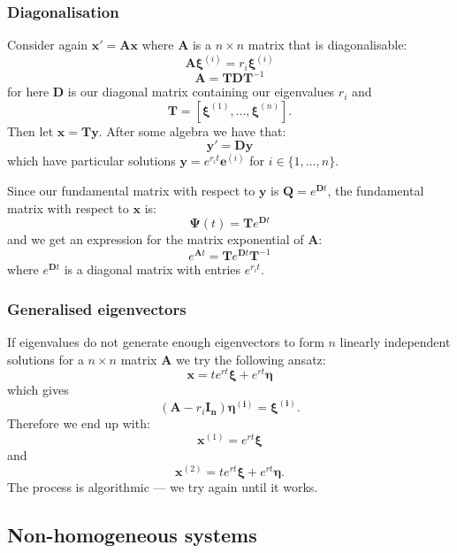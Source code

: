 \documentclass{article}
\newcommand{\matr}[1]{\mathbf{#1}}
\begin{document}
\newpage

\subsubsection{Diagonalisation}
Consider again $\boldsymbol{x}'
=\boldsymbol{A}\boldsymbol{x}$ where
$\boldsymbol{A}$ is a $n \times n$ matrix
that is diagonalisable:
$$\boldsymbol{A}\boldsymbol{\xi}^{(i)}
=r_i\boldsymbol{\xi}^{(i)}$$
$$\boldsymbol{A}=\boldsymbol{T}
\boldsymbol{D}\boldsymbol{T}^{-1}$$
for here $\boldsymbol{D}$ is our diagonal matrix
containing our eigenvalues $r_i$ and
$$\boldsymbol{T}
=[\boldsymbol{\xi}^{(1)},\dots
,\boldsymbol{\xi}^{(n)}].$$
Then let $\boldsymbol{x}=\boldsymbol{T}
\boldsymbol{y}$. After some algebra we have that:
$$\boldsymbol{y}'=\boldsymbol{D}\boldsymbol{y}$$
which have particular solutions
$\boldsymbol{y}=e^{r_i t}\boldsymbol{e}^{(i)}$
for $i\in\{1,\dots,n\}$.

Since our fundamental matrix with respect to
$\boldsymbol{y}$ is
$\boldsymbol{Q}=e^{\boldsymbol{D}t}$,
the fundamental matrix with respect to
$\boldsymbol{x}$ is:
$$\boldsymbol{\Psi}(t)
=\boldsymbol{T}e^{\boldsymbol{D}t}$$
and we get an expression for the matrix exponential
of $\boldsymbol{A}$:
$$e^{\boldsymbol{A}t}=\boldsymbol{T}
e^{\boldsymbol{D}t}\boldsymbol{T}^{-1}$$
where $e^{\boldsymbol{D}t}$ is a diagonal matrix
with entries $e^{r_i t}$.

\subsubsection{Generalised eigenvectors}
If eigenvalues do not generate enough eigenvectors to
form $n$ linearly independent solutions for a
$n\times n$ matrix $\boldsymbol{A}$ we try the following ansatz:
$$\boldsymbol{x}=te^{rt} \boldsymbol{\xi}+e^{rt} \boldsymbol{\eta}$$
which gives
$$(\matr{A}-r_i \matr{I_n})\boldsymbol{\eta^{(i)}}=\boldsymbol{\xi^{(i)}}.$$
Therefore we end up with:
$$\boldsymbol{x}^{(1)}=e^{rt}\boldsymbol{\xi}$$
and
$$\boldsymbol{x}^{(2)}
=te^{rt} \boldsymbol{\xi}+e^{rt} \boldsymbol{\eta}.$$
The process is algorithmic --- we try again
until it works.

\newpage
    
\subsection{Non-homogeneous systems}
\end{document}
